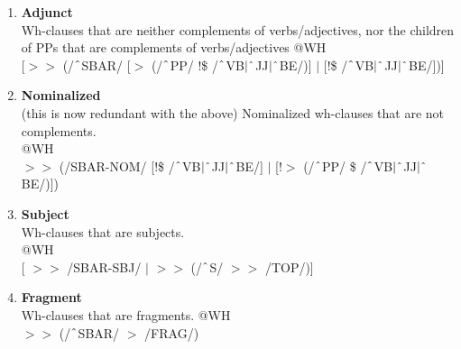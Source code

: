 \begin{enumerate}
\begin{enumerate}
            \item \textbf{Adjunct}\\ 
            Wh-clauses that are neither complements of verbs/adjectives, nor the children of PPs that are complements of verbs/adjectives
            @WH\\
            {}[$>\!\!>$ (/$\string^$SBAR/ [$>$ (/$\string^$PP/ !\$ /$\string^$VB$|\string^$JJ$|\string^$BE/)] $|$ [!\$ /$\string^$VB$|\string^$JJ$|\string^$BE/])]

            \item \textbf{Nominalized}\\
            (this is now redundant with the above)
            Nominalized wh-clauses that are not complements.\\
            @WH \\
            $>\!\!>$ (/SBAR-NOM/ [!\$ /$\string^$VB$|\string^$JJ$|\string^$BE/] $|$ [!$>$ (/$\string^$PP/ \$ /$\string^$VB$|\string^$JJ$|\string^$BE/)])

            \item \textbf{Subject}\\
            Wh-clauses that are subjects.\\
             @WH \\
            {}[ $>\!\!>$ /SBAR-SBJ/ $|$ $>\!\!>$ (/$\string^$S/ $>\!\!>$ /TOP/)]

            \item \textbf{Fragment}\\
            Wh-clauses that are fragments.
             @WH \\
            $>\!\!>$ (/$\string^$SBAR/ $>$ /FRAG/)
            

\end{enumerate}
\end{enumerate}
